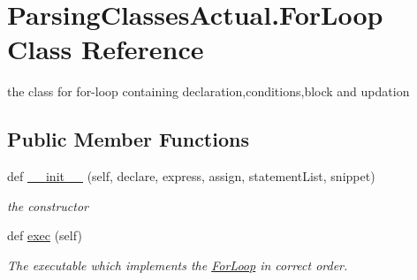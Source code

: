 \hypertarget{class_parsing_classes_actual_1_1_for_loop}{}\section{Parsing\+Classes\+Actual.\+For\+Loop Class Reference}
\label{class_parsing_classes_actual_1_1_for_loop}


the class for for-\/loop containing declaration,conditions,block and updation  


\subsection*{Public Member Functions}
\begin{DoxyCompactItemize}
\item 
def \hyperlink{class_parsing_classes_actual_1_1_for_loop_a1a97fc2d259b140ef8db3d3d455a286f}{\+\_\+\+\_\+init\+\_\+\+\_\+} (self, declare, express, assign, statement\+List, snippet)
\begin{DoxyCompactList}\small\item\em the constructor \end{DoxyCompactList}\item 
def \hyperlink{class_parsing_classes_actual_1_1_for_loop_a817cdfbfca1b14eb973d203863292940}{exec} (self)\hypertarget{class_parsing_classes_actual_1_1_for_loop_a817cdfbfca1b14eb973d203863292940}{}\label{class_parsing_classes_actual_1_1_for_loop_a817cdfbfca1b14eb973d203863292940}

\begin{DoxyCompactList}\small\item\em The executable which implements the \hyperlink{class_parsing_classes_actual_1_1_for_loop}{For\+Loop} in correct order. \end{DoxyCompactList}\end{DoxyCompactItemize}
